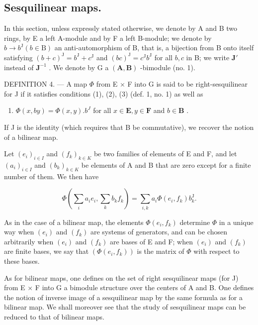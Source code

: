 \subsection{Sesquilinear maps.}

In this section, unless expressly stated otherwise, we denote by A and B two rings, by E a left A-module and by F a left B-module; we denote by \(b \to b^{\mathrm{J}} (b \in \mathrm{B})\) an anti-automorphism of B, that is, a bijection from B onto itself satisfying \((b + c)^{\mathrm{J}} = b^{\mathrm{J}} + c^{\mathrm{J}}\) and \((bc)^{\mathrm{J}} = c^{\mathrm{J}}b^{\mathrm{J}}\) for all \(b, c\) in B; we write \(\mathbf{J}'\) instead of \(\mathbf{J}^{-1}\) . We denote by G a \((\mathbf{A}, \mathbf{B})\) -bimodule (no. 1).

DEFINITION 4. --- A map \(\Phi\) from E \(\times\) F into G is said to be right-sesquilinear for J if it satisfies conditions (1), (2), (3) (def. 1, no. 1) as well as

\begin{enumerate}
\def\labelenumi{(\arabic{enumi})}
\setcounter{enumi}{6}
\tightlist
\item
  \(\Phi(x, by) = \Phi(x, y). b^J\) for all \(x \in \mathbf{E}, y \in \mathbf{F}\) and \(b \in \mathbf{B}\) .
\end{enumerate}

If J is the identity (which requires that B be commutative), we recover the notion of a bilinear map.

Let \((e_i)_{i\in I}\) and \((f_k)_{k\in K}\) be two families of elements of E and F, and let \((a_i)_{i\in I}\) and \((b_k)_{k\in K}\) be elements of A and B that are zero except for a finite number of them. We then have

\[
\Phi (\sum_ {i} a _ {i} e _ {i}, \sum_ {k} b _ {k} f _ {k}) = \sum_ {i, k} a _ {i} \Phi (e _ {i}, f _ {k}) b _ {k} ^ {\mathrm{J}}.\tag{8}
\]

As in the case of a bilinear map, the elements \(\Phi(e_i, f_k)\) determine \(\Phi\) in a unique way when \((e_i)\) and \((f_k)\) are systems of generators, and can be chosen arbitrarily when \((e_i)\) and \((f_k)\) are bases of E and F; when \((e_i)\) and \((f_k)\) are finite bases, we say that \((\Phi(e_i, f_k))\) is the matrix of \(\Phi\) with respect to these bases.

As for bilinear maps, one defines on the set of right sesquilinear maps (for J) from E × F into G a bimodule structure over the centers of A and B. One defines the notion of inverse image of a sesquilinear map by the same formula as for a bilinear map. We shall moreover see that the study of sesquilinear maps can be reduced to that of bilinear maps.

